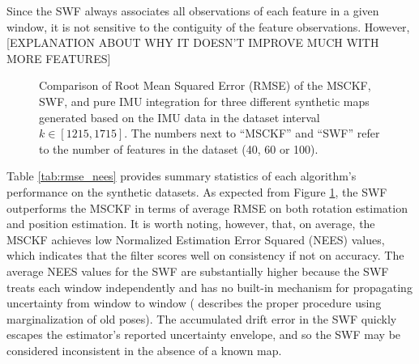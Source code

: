 \documentclass[letterpaper, 10 pt, conference]{ieeeconf}  %
\begin{document}
Since the SWF always associates all observations of each feature in a given window, it is not sensitive to the contiguity of the feature observations.
However, [EXPLANATION ABOUT WHY IT DOESN'T IMPROVE MUCH WITH MORE FEATURES]

\begin{figure}
    \centering


    \caption{Comparison of Root Mean Squared Error (RMSE) of the MSCKF, SWF, and pure IMU integration for three different synthetic maps generated based on the IMU data in the dataset interval $k\in[1215,1715]$. The numbers next to ``MSCKF'' and ``SWF'' refer to the number of features in the dataset (40, 60 or 100).}
    \label{fig:comp_3}
\end{figure}

Table \ref{tab:rmse_nees} provides summary statistics of each algorithm's performance on the synthetic datasets.
As expected from Figure \ref{fig:comp_3}, the SWF outperforms the MSCKF in terms of average RMSE on both rotation estimation and position estimation.
It is worth noting, however, that, on average, the MSCKF achieves low Normalized Estimation Error Squared (NEES) values, which indicates that the filter scores well on consistency if not on accuracy.
The average NEES values for the SWF are substantially higher because the SWF treats each window independently and has no built-in mechanism for propagating uncertainty from window to window (\cite{Sibley:2010:JFR} describes the proper procedure using marginalization of old poses).
The accumulated drift error in the SWF quickly escapes the estimator's reported uncertainty envelope, and so the SWF may be considered inconsistent in the absence of a known map.
\end{document}
